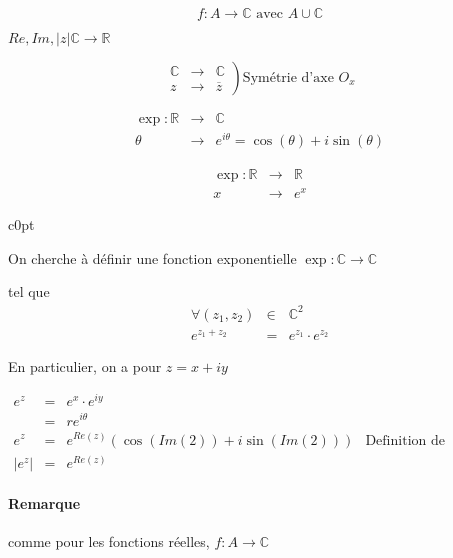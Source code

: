 \[f : A \rightarrow \mathbb{C} \text{ avec } A \cup \mathbb{C}\]

$Re, Im, |z| \mathbb{C}  \rightarrow \mathbb{R}$

\[\left.\begin{array}{rcl}
	\mathbb{C} &\rightarrow & \mathbb{C} \\
	z &\to& \overline{z}
\end{array}\right) \text{Symétrie d'axe } O_x\]

\[
\begin{array}{rcl}
\exp : \mathbb{R} &\rightarrow& \mathbb{C} \\
\theta &\to& e^{i\theta} = \cos(\theta) + i \sin(\theta)\end{array}\]

\[
\begin{array}{rcl}
\exp : \mathbb{R} &\rightarrow& \mathbb{R} \\
x &\to& e^{x}\end{array}\]

\begin{wrapfigure}[6]{c}{0pt}
\end{wrapfigure}

On cherche à définir une fonction exponentielle $\exp : \mathbb{C} \rightarrow \mathbb{C}$

tel que \[\begin{array}{rcl}
\forall(z_1, z_2) &\in& \mathbb{C}^2 \\
e^{z_1 + z_2} &=& e^{z_1}\cdot e^{z_2}\end{array}\]

En particulier, on a pour $z = x+iy$

\[\begin{array}{rclr}
	e^z &=& e^x \cdot e^{iy} \\
		&=& re^{i\theta} \\
		e^z &=& e^{Re(z)} (\cos(Im(2)) + i \sin(Im(2))) & \text{Definition de l'exponentielle complexe} \\
		|e^z| &=& e^{Re(z)}
\end{array}\]

\paragraph{Remarque} comme pour les fonctions réelles, $f : A \rightarrow \mathbb{C}$

